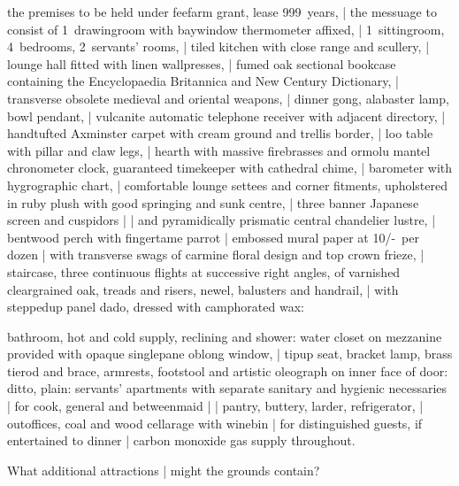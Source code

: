 \Household
the premises to be held under feefarm grant, lease 999~years, |
the messuage to consist of 1~drawingroom with baywindow
thermometer affixed, |
1~sittingroom, 4~bedrooms, 2~servants' rooms, |
tiled kitchen with close range and scullery, |
lounge hall fitted with linen wallpresses, |
fumed oak sectional bookcase
containing the Encyclopaedia Britannica and New Century Dictionary, |
transverse obsolete medieval and oriental weapons, |
dinner gong, alabaster lamp, bowl pendant, |
vulcanite automatic telephone receiver with adjacent directory, |
handtufted Axminster carpet with cream ground and trellis border, |
loo table with pillar and claw legs, |
hearth with massive firebrasses
and ormolu mantel chronometer clock, guaranteed timekeeper with cathedral chime, |
barometer with hygrographic chart, |
comfortable lounge settees
and corner fitments,
upholstered in ruby plush with good springing and sunk centre, |
three banner Japanese screen and cuspidors |
 |
and pyramidically prismatic central chandelier lustre, |
bentwood perch with fingertame parrot
 |
embossed mural paper at 10/-~per dozen |
with transverse swags of carmine floral design and top crown frieze, |
staircase, three continuous flights at successive right angles,
of varnished cleargrained oak, treads and risers, newel, balusters and handrail, |
with steppedup panel dado,
dressed with camphorated wax:

\Science
bathroom, hot and cold supply, reclining and shower:
water closet on mezzanine provided with opaque singlepane oblong window, |
tipup seat, bracket lamp, brass tierod and brace,
armrests, footstool and artistic oleograph on inner face of door:
ditto, plain:
servants' apartments with separate sanitary and hygienic necessaries |
for cook, general and betweenmaid |
 |
pantry, buttery, larder, refrigerator, |
outoffices, coal and wood cellarage with winebin
 |
for distinguished guests, if entertained to dinner
 |
carbon monoxide gas supply throughout.%


What additional attractions |
might the grounds contain?

